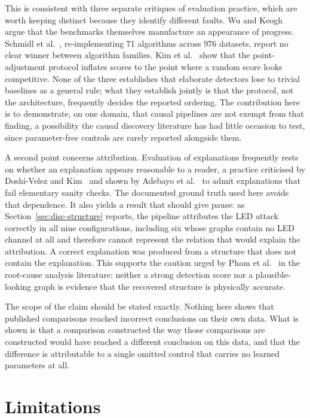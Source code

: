 This is consistent with three separate critiques of evaluation practice, which are worth keeping distinct because they identify different faults. Wu and Keogh~\cite{wu2023flawed} argue that the benchmarks themselves manufacture an appearance of progress. Schmidl et al.~\cite{schmidl2022anomaly}, re-implementing 71 algorithms across 976 datasets, report no clear winner between algorithm families. Kim et al.~\cite{kim2022rigorous} show that the point-adjustment protocol inflates scores to the point where a random score looks competitive. None of the three establishes that elaborate detectors lose to trivial baselines as a general rule; what they establish jointly is that the protocol, not the architecture, frequently decides the reported ordering. The contribution here is to demonstrate, on one domain, that causal pipelines are not exempt from that finding, a possibility the causal discovery literature has had little occasion to test, since parameter-free controls are rarely reported alongside them.

A second point concerns attribution. Evaluation of explanations frequently rests on whether an explanation appears reasonable to a reader, a practice criticised by Doshi-Velez and Kim~\cite{doshivelez2017rigorous} and shown by Adebayo et al.~\cite{adebayo2018sanity} to admit explanations that fail elementary sanity checks. The documented ground truth used here avoids that dependence. It also yields a result that should give pause: as Section~\ref{sec:disc-structure} reports, the pipeline attributes the LED attack correctly in all nine configurations, including six whose graphs contain no LED channel at all and therefore cannot represent the relation that would explain the attribution. A correct explanation was produced from a structure that does not contain the explanation. This supports the caution urged by Pham et al.~\cite{pham2024howfar} in the root-cause analysis literature: neither a strong detection score nor a plausible-looking graph is evidence that the recovered structure is physically accurate.

The scope of the claim should be stated exactly. Nothing here shows that published comparisons reached incorrect conclusions on their own data. What is shown is that a comparison constructed the way those comparisons are constructed would have reached a different conclusion on this data, and that the difference is attributable to a single omitted control that carries no learned parameters at all.

\section{Limitations}
\label{sec:conc-limitations}

